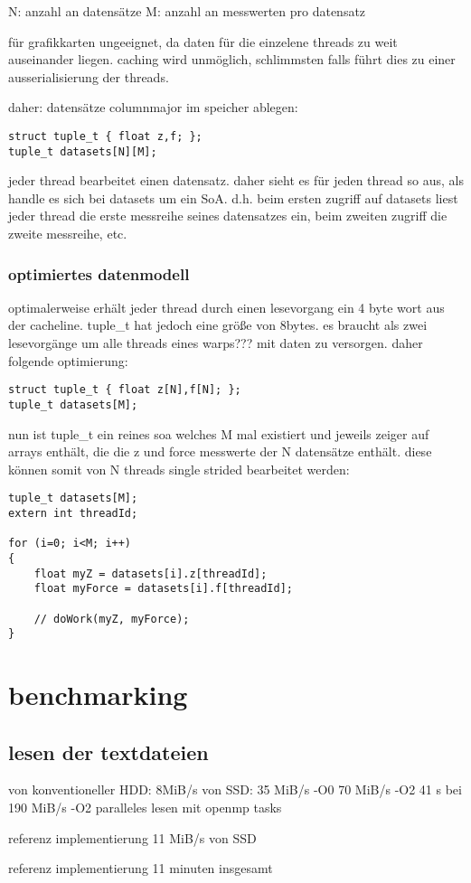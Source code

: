 N: anzahl an datensätze
M: anzahl an messwerten pro datensatz

für grafikkarten ungeeignet, da daten für die einzelene threads zu weit auseinander liegen. caching wird unmöglich, schlimmsten falls führt dies zu einer ausserialisierung der threads.

daher: datensätze columnmajor im speicher ablegen:

\begin{lstlisting}
struct tuple_t { float z,f; };
tuple_t datasets[N][M];
\end{lstlisting}

jeder thread bearbeitet einen datensatz. daher sieht es für jeden thread so aus, als handle es sich bei datasets um ein SoA. d.h. beim ersten zugriff auf datasets liest jeder thread die erste messreihe seines datensatzes ein, beim zweiten zugriff die zweite messreihe, etc.

\subsection{optimiertes datenmodell}
optimalerweise erhält jeder thread durch einen lesevorgang ein 4 byte wort aus der cacheline. tuple_t hat jedoch eine größe von 8bytes. es braucht als zwei lesevorgänge um alle threads eines warps??? mit daten zu versorgen.
daher folgende optimierung:

\begin{lstlisting}
struct tuple_t { float z[N],f[N]; };
tuple_t datasets[M];
\end{lstlisting}

nun ist tuple_t ein reines soa welches M mal existiert und jeweils zeiger auf arrays enthält, die die z und force messwerte der N datensätze enthält. diese können somit von N threads single strided bearbeitet werden:

\begin{lstlisting}
tuple_t datasets[M];
extern int threadId;

for (i=0; i<M; i++)
{
    float myZ = datasets[i].z[threadId];
    float myForce = datasets[i].f[threadId];
    
    // doWork(myZ, myForce);
}
\end{lstlisting}

\chapter{benchmarking}
\section{lesen der textdateien}
von konventioneller HDD: 8MiB/s
von SSD:  35 MiB/s -O0
70 MiB/s -O2
41 s bei 190 MiB/s -O2 paralleles lesen mit openmp tasks

referenz implementierung 11 MiB/s von SSD

referenz implementierung 11 minuten insgesamt
